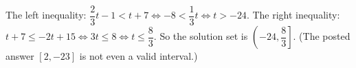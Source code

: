 The left inequality: $\dfrac{2}{3}t-1<t+7\iff-8<\dfrac{1}{3}t\iff t>-24$. The right inequality: $t+7\le-2t+15\iff3t\le8\iff t\le\dfrac{8}{3}$. So the solution set is $\boxed{\left(-24,\dfrac{8}{3}\right]}$. (The posted answer $[2,-23]$ is not even a valid interval.)
